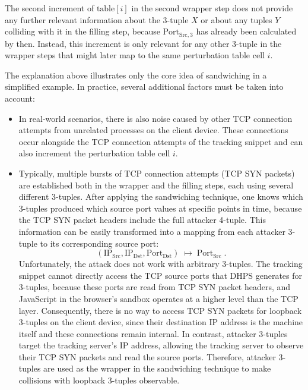 \documentclass[twocolumn]{report}
\begin{document}
The second increment of \(\text{table}[i]\) in the second wrapper step does \alert{not provide any further relevant information} about the 3-tuple \( X \) or about any tuples \( Y \) colliding with it in the filling step, because \(\text{Port}_{\text{Src},3}\) has already been calculated by then. Instead, this increment is only relevant for any other 3-tuple in the wrapper steps that might later map to the same perturbation table cell \( i \).

The explanation above illustrates only the \alert{core idea of sandwiching} in a simplified example. In practice, several additional factors must be taken into account:

\begin{itemize}
	\item {} In real-world scenarios, there is also \alert{noise} caused by other TCP connection attempts from unrelated processes on the client device. These connections occur alongside the TCP connection attempts of the tracking snippet and can also increment the perturbation table cell \( i \).
	\item {} Typically, multiple \alert{bursts of TCP connection attempts} (TCP SYN packets) are established both in the wrapper and the filling steps, each using several different 3-tuples. After applying the sandwiching technique, one knows which 3-tuples produced which source port values at specific points in time, because the \alert{TCP SYN packet headers} include the full attacker 4-tuple. This information can be easily transformed into a mapping from each attacker 3-tuple to its corresponding source port:
	\[
		(\mathrm{IP_{Src}}, \mathrm{IP_{Dst}}, \mathrm{Port_{Dst}}) \;\mapsto\; \mathrm{Port_{Src}}\;\text{.}
	\]
	 Unfortunately, the attack does not work with arbitrary 3-tuples. The tracking snippet cannot directly access the TCP source ports that DHPS generates for 3-tuples, because these ports are read from TCP SYN packet headers, and JavaScript in the \alert{browser’s sandbox} operates at a higher level than the TCP layer. Consequently, there is no way to access TCP SYN packets for \alert{loopback 3-tuples} on the client device, since their destination IP address is the machine itself and these connections remain internal. In contrast, \alert{attacker 3-tuples} target the tracking server’s IP address, allowing the \alert{tracking server} to observe their TCP SYN packets and read the source ports. Therefore, attacker 3-tuples are used as the wrapper in the sandwiching technique to make collisions with loopback 3-tuples observable.
\end{itemize}
\end{document}
